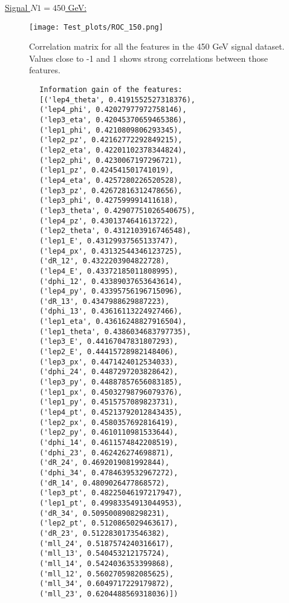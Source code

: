 \documentclass[a4paper, american, 12pt]{report}
\begin{document}
	\underline{Signal $N1=450$ GeV:}
	\begin{figure}[h!tb]
		\centering\texttt{[image: Test\_plots/ROC\_150.png]}
		\caption[Correlation matrix for the features in the 450 GeV signal.]{Correlation matrix for all the features in the 450 GeV signal dataset. Values close to -1 and 1 shows strong correlations between those features. \label{fig:Corr_450}}
	\end{figure}
	\begin{lstlisting}
		Information gain of the features:
		[('lep4_theta', 0.4191552527318376), 
		('lep4_phi', 0.42027977972758146), 
		('lep3_eta', 0.42045370659465386), 
		('lep1_phi', 0.4210809806293345), 
		('lep2_pz', 0.42162772292849215), 
		('lep2_eta', 0.42201102378344824), 
		('lep2_phi', 0.4230067197296721), 
		('lep1_pz', 0.424541501741019), 
		('lep4_eta', 0.4257280226520528), 
		('lep3_pz', 0.42672816312478656), 
		('lep3_phi', 0.427599991411618), 
		('lep3_theta', 0.42907751026540675), 
		('lep4_pz', 0.4301374641613722), 
		('lep2_theta', 0.4312103916746548), 
		('lep1_E', 0.43129937565133747), 
		('lep4_px', 0.43132544346123725), 
		('dR_12', 0.4322203904822728), 
		('lep4_E', 0.43372185011808995), 
		('dphi_12', 0.43389037653643614), 
		('lep4_py', 0.43395756196715096), 
		('dR_13', 0.4347988629887223), 
		('dphi_13', 0.43616113224927466), 
		('lep1_eta', 0.43616248827916504), 
		('lep1_theta', 0.4386034683797735), 
		('lep3_E', 0.44167047831807293), 
		('lep2_E', 0.44415728982148406), 
		('lep3_px', 0.4471424012534033), 
		('dphi_24', 0.4487297203828642), 
		('lep3_py', 0.44887857656083185), 
		('lep1_px', 0.45032798796079376), 
		('lep1_py', 0.4515757089823731), 
		('lep4_pt', 0.45213792012843435), 
		('lep2_px', 0.4580357692816419), 
		('lep2_py', 0.4610110981533644), 
		('dphi_14', 0.4611574842208519), 
		('dphi_23', 0.462426274698871), 
		('dR_24', 0.4692019081992844), 
		('dphi_34', 0.4784639532967272), 
		('dR_14', 0.4809026477868572), 
		('lep3_pt', 0.48225046197217947), 
		('lep1_pt', 0.49983354913044953), 
		('dR_34', 0.5095008908298231), 
		('lep2_pt', 0.5120865029463617), 
		('dR_23', 0.5122830173546382), 
		('mll_24', 0.5187574240316617), 
		('mll_13', 0.540453212175724), 
		('mll_14', 0.5424036353399868), 
		('mll_12', 0.5602705982085625), 
		('mll_34', 0.6049717229179872), 
		('mll_23', 0.6204488569318036)])
	\end{lstlisting}
	
	
	

	\printglossary[type=\acronymtype]
	
	

	
	
\end{document}
